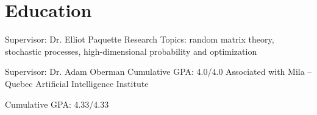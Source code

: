 \documentclass{muratcan_cv}
\begin{document}
\headerview
\vspace{1ex}
%
%


    
\section{Education} 

    
     \begin{itemize}
         \footnotesize {
          Supervisor: Dr. Elliot Paquette
          Research Topics:
         random matrix theory, stochastic processes, high-dimensional probability and optimization}
     \end{itemize}

    
     \begin{itemize}
         \footnotesize {
          Supervisor: Dr. Adam Oberman
          Cumulative GPA: 4.0/4.0
          Associated with Mila – Quebec Artificial Intelligence Institute}
     \end{itemize}
     
    \begin{itemize}
        \footnotesize {
          Cumulative GPA: 4.33/4.33
         }
    \end{itemize}
    
\end{document}

